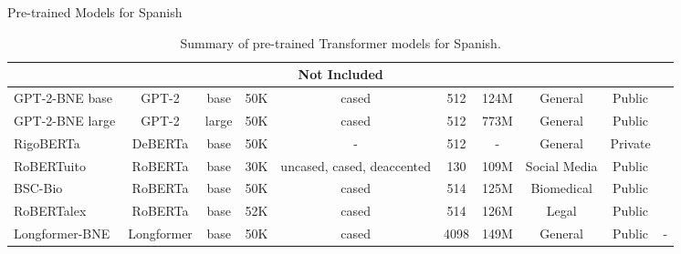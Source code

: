 \documentclass[aspectratio=169,xcolor=dvipsnames]{beamer}
\begin{document}
\begin{frame}{Pre-trained Models for Spanish}
\begin{table}[]
\begin{center}
{\begin{tabular}{lccccccccc}
\multicolumn{10}{c}{Not Included}                                                                                                                                                                                                                           \\ \hline
GPT-2-BNE base      & GPT-2                 & base                & 50K                      & cased                      & 512                          & 124M                          & General         & Public                &      \citep{gutierrezfandino2022-roberta-bne} \\
GPT-2-BNE large     & GPT-2                 & large               & 50K                      & cased                      & 512                          & 773M                          & General         & Public                &
\citep{gutierrezfandino2022-roberta-bne} \\
RigoBERTa           & DeBERTa               & base                & 50K                      & -                          & 512                          & -                             & General         & Private               & 
\citep{serrano2022rigoberta}             \\
RoBERTuito          & RoBERTa               & base                & 30K                      & uncased, cased, deaccented & 130                          & 109M                          & Social Media    & Public                &      \citep{perez-etal-2022-robertuito}       \\
BSC-Bio             & RoBERTa               & base                & 50K                      & cased                      & 514                          & 125M                          & Biomedical      & Public                &      \citep{carrino-etal-2022-pretrained}     \\
RoBERTalex          & RoBERTa               & base                & 52K                      & cased                      & 514                          & 126M                          & Legal           & Public                &      \citep{gutierrezfandino2021legal}        \\
Longformer-BNE      & Longformer            & base                & 50K                      & cased                      & 4098                         & 149M                          & General         & Public                &      -                      \\ \hline
\end{tabular}}
\end{center}
\caption{Summary of pre-trained Transformer models for Spanish.}
\label{table:summary-spanish-models}
\end{table}

\end{frame}
\end{document}
